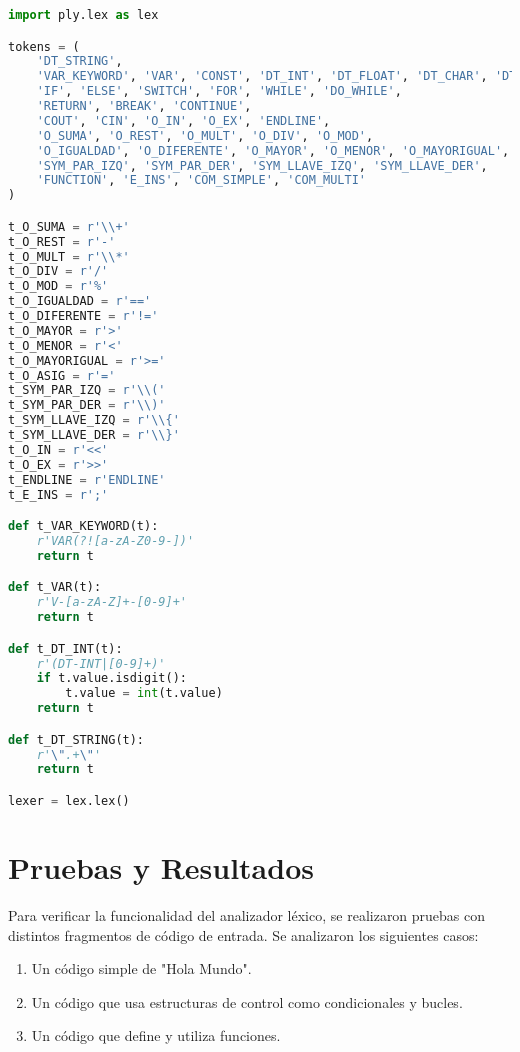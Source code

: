 \documentclass[a4paper,12pt]{article}
\begin{document}
\begin{lstlisting}[language=Python, caption=Código del analizador léxico, basicstyle=\ttfamily, keywordstyle=\color{blue}]
import ply.lex as lex

tokens = (
    'DT_STRING',
    'VAR_KEYWORD', 'VAR', 'CONST', 'DT_INT', 'DT_FLOAT', 'DT_CHAR', 'DT_BOOL',
    'IF', 'ELSE', 'SWITCH', 'FOR', 'WHILE', 'DO_WHILE',
    'RETURN', 'BREAK', 'CONTINUE',
    'COUT', 'CIN', 'O_IN', 'O_EX', 'ENDLINE',
    'O_SUMA', 'O_REST', 'O_MULT', 'O_DIV', 'O_MOD',
    'O_IGUALDAD', 'O_DIFERENTE', 'O_MAYOR', 'O_MENOR', 'O_MAYORIGUAL', 'O_ASIG',
    'SYM_PAR_IZQ', 'SYM_PAR_DER', 'SYM_LLAVE_IZQ', 'SYM_LLAVE_DER',
    'FUNCTION', 'E_INS', 'COM_SIMPLE', 'COM_MULTI'
)

t_O_SUMA = r'\\+'
t_O_REST = r'-'
t_O_MULT = r'\\*'
t_O_DIV = r'/'
t_O_MOD = r'%'
t_O_IGUALDAD = r'=='
t_O_DIFERENTE = r'!='
t_O_MAYOR = r'>'
t_O_MENOR = r'<'
t_O_MAYORIGUAL = r'>='
t_O_ASIG = r'='
t_SYM_PAR_IZQ = r'\\('
t_SYM_PAR_DER = r'\\)'
t_SYM_LLAVE_IZQ = r'\\{'
t_SYM_LLAVE_DER = r'\\}'
t_O_IN = r'<<'
t_O_EX = r'>>'
t_ENDLINE = r'ENDLINE'
t_E_INS = r';'

def t_VAR_KEYWORD(t):
    r'VAR(?![a-zA-Z0-9-])'
    return t

def t_VAR(t):
    r'V-[a-zA-Z]+-[0-9]+'
    return t

def t_DT_INT(t):
    r'(DT-INT|[0-9]+)'
    if t.value.isdigit():
        t.value = int(t.value)
    return t

def t_DT_STRING(t):
    r'\".+\"'
    return t

lexer = lex.lex()
\end{lstlisting}

\section{Pruebas y Resultados}
Para verificar la funcionalidad del analizador léxico, se realizaron pruebas con distintos fragmentos de código de entrada. Se analizaron los siguientes casos:
\begin{enumerate}
    \item Un código simple de "Hola Mundo".
    \item Un código que usa estructuras de control como condicionales y bucles.
    \item Un código que define y utiliza funciones.
\end{enumerate}
\end{document}
